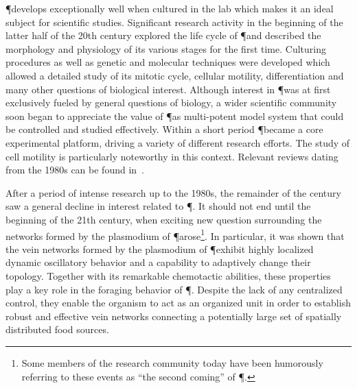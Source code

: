 		\P develops exceptionally well when cultured in the lab which makes it an ideal subject for scientific studies. Significant research activity in the beginning of the latter half of the 20th century explored the life cycle of \P and described the morphology and physiology of its various stages for the first time. Culturing procedures as well as genetic and molecular techniques were developed which allowed a detailed study of its mitotic cycle, cellular motility, differentiation and many other questions of biological interest. Although interest in \P was at first exclusively fueled by general questions of biology, a wider scientific community soon began to appreciate the value of \P as multi-potent model system that could be controlled and studied effectively. Within a short period \P became a core experimental platform, driving a variety of different research efforts. The study of cell motility is particularly noteworthy in this context. Relevant reviews dating from the 1980s can be found in~\cite{dove1980growth, aldrich2012cell,sauer1982developmental,Sauer1986}.

		After a period of intense research up to the 1980s, the remainder of the century saw a general decline in interest related to \P. It should not end until the beginning of the 21th century, when exciting new question surrounding the networks formed by the plasmodium of \P arose\footnote{Some members of the research community today have been humorously referring to these events as ``the second coming'' of \P.}. In particular, it was shown that the vein networks formed by the plasmodium of \P exhibit highly localized dynamic oscillatory behavior and a capability to adaptively change their topology. Together with its remarkable chemotactic abilities, these properties play a key role in the foraging behavior of \P. Despite the lack of any centralized control, they enable the organism to act as an organized unit in order to establish robust and effective vein networks connecting a potentially large set of spatially distributed food sources. 

